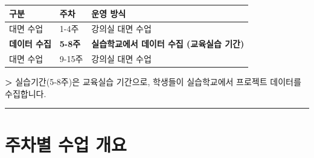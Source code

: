 \documentclass[11pt, a4paper]{article}
\newcommand{\note}[1]{%
    \vspace{3pt}
    \noindent\textcolor{textgray}{\textbf{>} #1}
    \vspace{3pt}
}
\begin{document}
\begin{table}[H]
\centering
\begin{tabular}{|C{2cm}|C{2cm}|L{9.5cm}|}
\hline
{}
\textbf{구분} & \textbf{주차} & \textbf{운영 방식} \\
\hline
대면 수업 & 1-4주 & 강의실 대면 수업 \\
\hline
{}
\textbf{데이터 수집} & \textbf{5-8주} & \textbf{실습학교에서 데이터 수집 (교육실습 기간)} \\
\hline
대면 수업 & 9-15주 & 강의실 대면 수업 \\
\hline
\end{tabular}
\end{table}

\note{실습기간(5-8주)은 교육실습 기간으로, 학생들이 실습학교에서 프로젝트 데이터를 수집합니다.}

\vspace{3pt}
\noindent\rule{\textwidth}{0.3pt}

\section{주차별 수업 개요}
\end{document}
